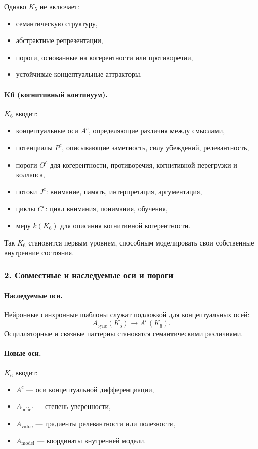 Однако $K_5$ не включает:
\begin{itemize}
  \item семантическую структуру,
  \item абстрактные репрезентации,
  \item пороги, основанные на когерентности или противоречии,
  \item устойчивые концептуальные аттракторы.
\end{itemize}

\paragraph{K6 (когнитивный континуум).}
$K_6$ вводит:
\begin{itemize}
  \item концептуальные оси $A^{c}$, определяющие различия между смыслами,
  \item потенциалы $P^{c}$, описывающие заметность, силу убеждений,
        релевантность,
  \item пороги $\Theta^{c}$ для когерентности, противоречия,
        когнитивной перегрузки и коллапса,
  \item потоки $J^{c}$: внимание, память, интерпретация, аргументация,
  \item циклы $C^{c}$: цикл внимания, понимания, обучения,
  \item меру $k(K_6)$ для описания когнитивной когерентности.
\end{itemize}

Так $K_6$ становится первым уровнем, способным моделировать свои собственные
внутренние состояния.

\subsubsection{2. Совместные и наследуемые оси и пороги}

\paragraph{Наследуемые оси.}
Нейронные синхронные шаблоны служат подложкой для концептуальных осей:
\[
A_{\mathrm{sync}}(K_5) \rightarrow A^{c}(K_6).
\]
Осцилляторные и связные паттерны становятся семантическими различиями.

\paragraph{Новые оси.}
$K_6$ вводит:
\begin{itemize}
  \item $A^{c}$ — оси концептуальной дифференциации,
  \item $A_{\mathrm{belief}}$ — степень уверенности,
  \item $A_{\mathrm{value}}$ — градиенты релевантности или полезности,
  \item $A_{\mathrm{model}}$ — координаты внутренней модели.
\end{itemize}

